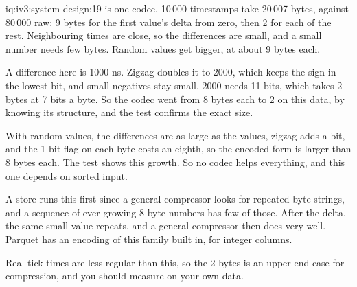 \begin{solution}{iq:iv3:system-design:19}
 is one codec. 10\,000 timestamps take 20\,007 bytes, against 80\,000 raw: 9 bytes for the first value's delta from zero, then 2 for each of the rest. Neighbouring times are close, so the differences are small, and a small number needs few bytes. Random values get bigger, at about 9 bytes each.
\label{lst:iv3:sd:delta}

A difference here is 1000 ns. Zigzag doubles it to 2000, which keeps the sign in the lowest bit, and small negatives stay small. 2000 needs 11 bits, which takes 2 bytes at 7 bits a byte. So the codec went from 8 bytes each to 2 on this data, by knowing its structure, and the test confirms the exact size.

With random values, the differences are as large as the values, zigzag adds a bit, and the 1-bit flag on each byte costs an eighth, so the encoded form is larger than 8 bytes each. The test shows this growth. So no codec helps everything, and this one depends on sorted input.

A store runs this first since a general compressor looks for repeated byte strings, and a sequence of ever-growing 8-byte numbers has few of those. After the delta, the same small value repeats, and a general compressor then does very well. Parquet has an encoding of this family built in, for integer columns.

Real tick times are less regular than this, so the 2 bytes is an upper-end case for compression, and you should measure on your own data.

\end{solution}

